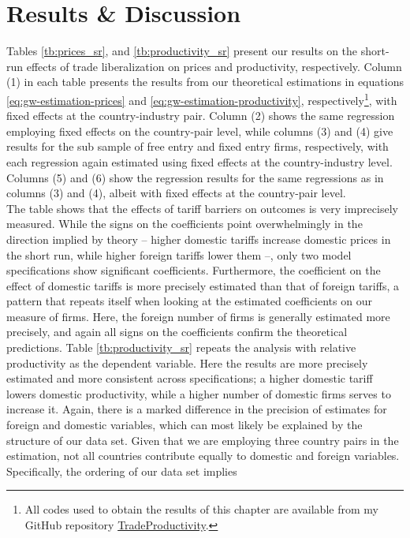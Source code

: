 \section{Results \& Discussion}\label{sec:disc4}
Tables \ref{tb:prices_sr}, and \ref{tb:productivity_sr} present 
our results on the short-run effects of trade liberalization on prices 
and productivity, respectively. Column (1) in each table presents the results from 
our theoretical estimations in equations \ref{eq:gw-estimation-prices} and \ref{eq:gw-estimation-productivity}, 
respectively\footnote{All codes used to obtain the results of this chapter are 
available from my GitHub repository 
\href{https://github.com/nilshg/TradeProductivity}{TradeProductivity}.}, with 
fixed effects at the country-industry pair. Column (2) shows the same regression
employing fixed effects on the country-pair level, while columns (3) and (4) 
give results for the sub sample of free entry and fixed entry firms, respectively, 
with each regression again estimated using fixed effects at the country-industry
level. Columns (5) and (6) show the regression results for the same regressions
as in columns (3) and (4), albeit with fixed effects at the country-pair level. \\
The table shows that the effects of tariff barriers on outcomes is very imprecisely
measured. While the signs on the coefficients point overwhelmingly in the direction
implied by theory -- higher domestic tariffs increase domestic prices in the short
run, while higher foreign tariffs lower them --, only two model specifications
show significant coefficients. Furthermore, the coefficient on the effect of domestic tariffs is
more precisely estimated than that of foreign tariffs, a pattern that repeats
itself when looking at the estimated coefficients on our measure of firms. Here,
the foreign number of firms is generally estimated more precisely, and again all
signs on the coefficients confirm the theoretical predictions. Table \ref{tb:productivity_sr}
repeats the analysis with relative productivity as the dependent variable. Here
the results are more precisely estimated and more consistent across specifications; 
a higher domestic tariff lowers domestic productivity, while a higher number of
domestic firms serves to increase it. Again, there is a marked difference in 
the precision of estimates for foreign and domestic variables, which can most 
likely be explained by the structure of our data set. Given that we are employing
three country pairs in the estimation, not all countries contribute equally to
domestic and foreign variables. Specifically, the ordering of our data set implies
